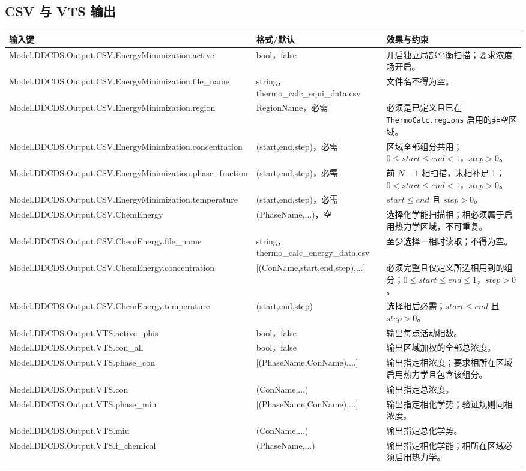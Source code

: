 \documentclass[UTF8,a4paper,11pt]{ctexart}
\newcommand{\code}[1]{\texttt{#1}}
\begin{document}
\subsection{CSV 与 VTS 输出}

\begin{longtable}{>{\ttfamily}p{}p{}p{}}
\toprule
\normalfont 输入键 & 格式/默认 & 效果与约束\\
\midrule
\endhead
Model.DDCDS.Output.CSV.EnergyMinimization.active & bool，false & 开启独立局部平衡扫描；要求浓度场开启。\\
Model.DDCDS.Output.CSV.EnergyMinimization.file\_name & string，thermo\_calc\_equi\_data.csv & 文件名不得为空。\\
Model.DDCDS.Output.CSV.EnergyMinimization.region & RegionName，必需 & 必须是已定义且已在 \code{ThermoCalc.regions} 启用的非空区域。\\
Model.DDCDS.Output.CSV.EnergyMinimization.concentration & (start,end,step)，必需 & 区域全部组分共用；$0\le start\le end<1$，$step>0$。\\
Model.DDCDS.Output.CSV.EnergyMinimization.phase\_fraction & (start,end,step)，必需 & 前 $N-1$ 相扫描，末相补足 1；$0<start\le end<1$，$step>0$。\\
Model.DDCDS.Output.CSV.EnergyMinimization.temperature & (start,end,step)，必需 & $start\le end$ 且 $step>0$。\\
Model.DDCDS.Output.CSV.ChemEnergy & (PhaseName,...)，空 & 选择化学能扫描相；相必须属于启用热力学区域，不可重复。\\
Model.DDCDS.Output.CSV.ChemEnergy.file\_name & string，thermo\_calc\_energy\_data.csv & 至少选择一相时读取；不得为空。\\
Model.DDCDS.Output.CSV.ChemEnergy.concentration & [(ConName,start,end,step),...] & 必须完整且仅定义所选相用到的组分；$0\le start\le end\le1$，$step>0$。\\
Model.DDCDS.Output.CSV.ChemEnergy.temperature & (start,end,step) & 选择相后必需；$start\le end$ 且 $step>0$。\\
Model.DDCDS.Output.VTS.active\_phis & bool，false & 输出每点活动相数。\\
Model.DDCDS.Output.VTS.con\_all & bool，false & 输出区域加权的全部总浓度。\\
Model.DDCDS.Output.VTS.phase\_con & [(PhaseName,ConName),...] & 输出指定相浓度；要求相所在区域启用热力学且包含该组分。\\
Model.DDCDS.Output.VTS.con & (ConName,...) & 输出指定总浓度。\\
Model.DDCDS.Output.VTS.phase\_miu & [(PhaseName,ConName),...] & 输出指定相化学势；验证规则同相浓度。\\
Model.DDCDS.Output.VTS.miu & (ConName,...) & 输出指定总化学势。\\
Model.DDCDS.Output.VTS.f\_chemical & (PhaseName,...) & 输出指定相化学能；相所在区域必须启用热力学。\\
\bottomrule
\end{longtable}
\end{document}
